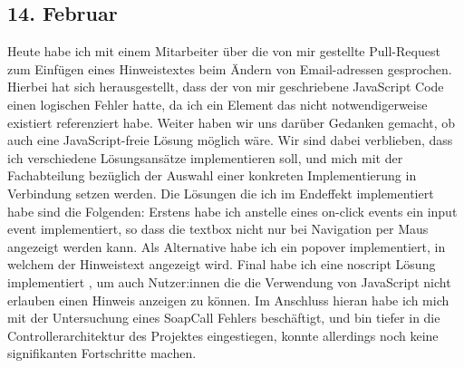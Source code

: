 \subsection{14. Februar}
Heute habe ich mit einem Mitarbeiter über die von mir gestellte Pull-Request zum Einfügen eines Hinweistextes beim Ändern von Email-adressen gesprochen. Hierbei hat sich herausgestellt, dass der von mir geschriebene JavaScript Code einen logischen Fehler hatte, da ich ein Element das nicht notwendigerweise existiert referenziert habe. Weiter haben wir uns darüber Gedanken gemacht, ob auch eine JavaScript-freie Lösung möglich wäre. Wir sind dabei verblieben, dass ich verschiedene Lösungsansätze implementieren soll, und mich mit der Fachabteilung bezüglich der Auswahl einer konkreten Implementierung in Verbindung setzen werden. Die Lösungen die ich im Endeffekt implementiert habe sind die Folgenden: Erstens habe ich anstelle eines on-click events ein input event implementiert, so dass die textbox nicht nur bei Navigation per Maus angezeigt werden kann. Als Alternative habe ich ein popover implementiert, in welchem der Hinweistext angezeigt wird. Final habe ich eine noscript Lösung implementiert , um auch Nutzer:innen die die Verwendung von JavaScript nicht erlauben einen Hinweis anzeigen zu können.
Im Anschluss hieran habe ich mich mit der Untersuchung eines SoapCall Fehlers beschäftigt, und bin tiefer in die Controllerarchitektur des Projektes eingestiegen, konnte allerdings noch keine signifikanten Fortschritte machen.